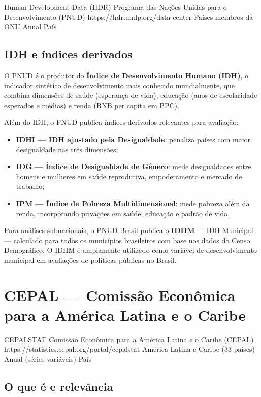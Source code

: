 \ficharapida
  {Human Development Data (HDR)}
  {Programa das Nações Unidas para o Desenvolvimento (PNUD)}
  {https://hdr.undp.org/data-center}
  {Países membros da ONU}
  {Anual}
  {País}

\subsection{IDH e índices derivados}

O PNUD é o produtor do \textbf{Índice de Desenvolvimento Humano (IDH)}, o indicador sintético de desenvolvimento mais conhecido mundialmente, que combina dimensões de saúde (esperança de vida), educação (anos de escolaridade esperados e médios) e renda (RNB per capita em PPC).

Além do IDH, o PNUD publica índices derivados relevantes para avaliação:
\begin{itemize}
  \item \textbf{IDHI --- IDH ajustado pela Desigualdade}: penaliza países com maior desigualdade nas três dimensões;
  \item \textbf{IDG --- Índice de Desigualdade de Gênero}: mede desigualdades entre homens e mulheres em saúde reprodutiva, empoderamento e mercado de trabalho;
  \item \textbf{IPM --- Índice de Pobreza Multidimensional}: mede pobreza além da renda, incorporando privações em saúde, educação e padrão de vida.
\end{itemize}

Para análises subnacionais, o PNUD Brasil publica o \textbf{IDHM} --- IDH Municipal --- calculado para todos os municípios brasileiros com base nos dados do Censo Demográfico. O IDHM é amplamente utilizado como variável de desenvolvimento municipal em avaliações de políticas públicas no Brasil.

\section{CEPAL --- Comissão Econômica para a América Latina e o Caribe}

\ficharapida
  {CEPALSTAT}
  {Comissão Econômica para a América Latina e o Caribe (CEPAL)}
  {https://statistics.cepal.org/portal/cepalstat}
  {América Latina e Caribe (33 países)}
  {Anual (séries variáveis)}
  {País}

\subsection{O que é e relevância}

